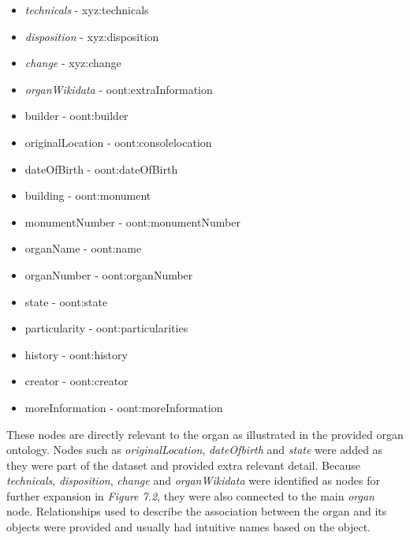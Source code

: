 \vspace{-0.15cm}
\begin{itemize}
    \itemsep0em 
    \item \textit{technicals} - xyz:technicals
    \vspace{-0.1cm}
    \item \textit{disposition} - xyz:disposition
    \vspace{-0.1cm}
    \item \textit{change} - xyz:change
    \vspace{-0.1cm}
    \item \textit{organWikidata} - oont:extraInformation
    \vspace{-0.1cm}
    \item builder - oont:builder
    \vspace{-0.1cm}
    \item originalLocation - oont:consolelocation
    \vspace{-0.1cm}
    \item dateOfBirth - oont:dateOfBirth
    \vspace{-0.1cm}
    \item building - oont:monument
    \vspace{-0.1cm}
    \item monumentNumber - oont:monumentNumber
    \vspace{-0.1cm}
    \item organName - oont:name
    \vspace{-0.1cm}
    \item organNumber - oont:organNumber 
    \vspace{-0.1cm}
    \item state - oont:state 
    \vspace{-0.1cm}
    \item particularity - oont:particularities
    \vspace{-0.1cm}
    \item history - oont:history
    \vspace{-0.1cm}
    \item creator - oont:creator
    \vspace{-0.1cm}
    \item moreInformation - oont:moreInformation 
\end{itemize}

These nodes are directly relevant to the organ as illustrated in the provided organ ontology. Nodes such as \textit{originalLocation}, \textit{dateOfbirth} and \textit{state} were added as they were part of the dataset and provided extra relevant detail. Because \textit{technicals}, \textit{disposition}, \textit{change} and \textit{organWikidata} were identified as nodes for further expansion in \textit{Figure 7.2}, they were also connected to the main \textit{organ} node. Relationships used to describe the association between the organ and its objects were provided and usually had intuitive names based on the object. 

